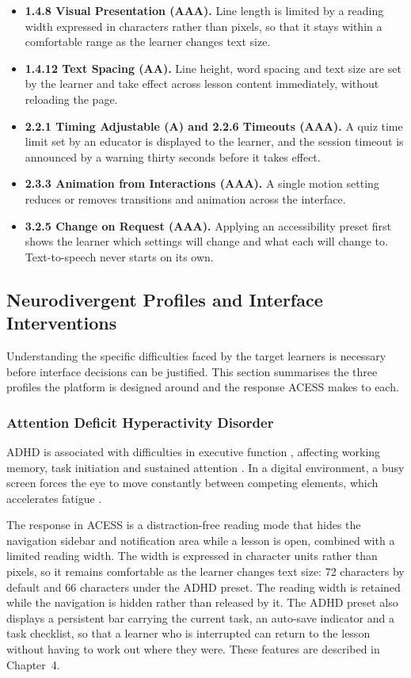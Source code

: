 \documentclass[12pt, oneside]{article} %
\begin{document}
\begin{itemize}
    \item \textbf{1.4.8 Visual Presentation (AAA).} Line length is limited by a reading width expressed in characters rather than pixels, so that it stays within a comfortable range as the learner changes text size.
    \item \textbf{1.4.12 Text Spacing (AA).} Line height, word spacing and text size are set by the learner and take effect across lesson content immediately, without reloading the page.
    \item \textbf{2.2.1 Timing Adjustable (A) and 2.2.6 Timeouts (AAA).} A quiz time limit set by an educator is displayed to the learner, and the session timeout is announced by a warning thirty seconds before it takes effect.
    \item \textbf{2.3.3 Animation from Interactions (AAA).} A single motion setting reduces or removes transitions and animation across the interface.
    \item \textbf{3.2.5 Change on Request (AAA).} Applying an accessibility preset first shows the learner which settings will change and what each will change to. Text-to-speech never starts on its own.
\end{itemize}

\subsection{Neurodivergent Profiles and Interface Interventions}

Understanding the specific difficulties faced by the target learners is necessary before interface decisions can be justified. This section summarises the three profiles the platform is designed around and the response ACESS makes to each.

\subsubsection{Attention Deficit Hyperactivity Disorder}
ADHD is associated with difficulties in executive function \cite{zelazo2003executive}, affecting working memory, task initiation and sustained attention \cite{barkley1997adhd}. In a digital environment, a busy screen forces the eye to move constantly between competing elements, which accelerates fatigue \cite{munoz2003saccadic}.

The response in ACESS is a distraction-free reading mode that hides the navigation sidebar and notification area while a lesson is open, combined with a limited reading width. The width is expressed in character units rather than pixels, so it remains comfortable as the learner changes text size: 72 characters by default and 66 characters under the ADHD preset. The reading width is retained while the navigation is hidden rather than released by it. The ADHD preset also displays a persistent bar carrying the current task, an auto-save indicator and a task checklist, so that a learner who is interrupted can return to the lesson without having to work out where they were. These features are described in Chapter~4.
\end{document}
